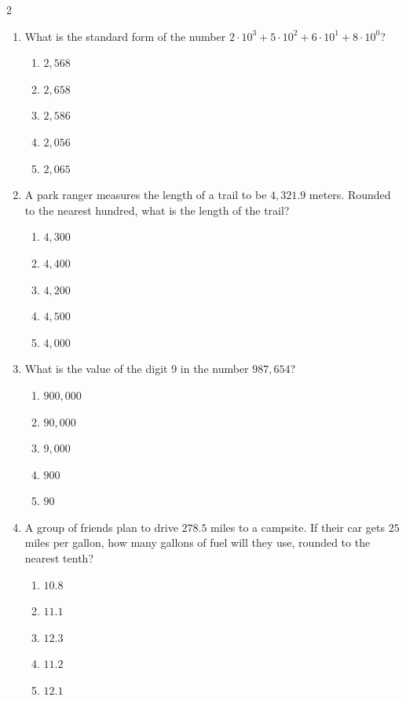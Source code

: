 \documentclass[10pt]{article}
\begin{document}
\begin{multicols}{2}
\begin{enumerate}[label=\textbf{Q\arabic*.}, leftmargin=*, itemsep=6pt, parsep=0pt]
  \item \small What is the standard form of the number $2 \cdot 10^3 + 5 \cdot 10^2 + 6 \cdot 10^1 + 8 \cdot 10^0$?
  \begin{enumerate}[label=(\Alph*), leftmargin=0.6cm, nosep, itemsep=2pt]
    \item $2,568$
    \item $2,658$
    \item $2,586$
    \item $2,056$
    \item $2,065$
  \end{enumerate}

  \item \small A park ranger measures the length of a trail to be $4,321.9$ meters. Rounded to the nearest hundred, what is the length of the trail?
  \begin{enumerate}[label=(\Alph*), leftmargin=0.6cm, nosep, itemsep=2pt]
    \item $4,300$
    \item $4,400$
    \item $4,200$
    \item $4,500$
    \item $4,000$
  \end{enumerate}

  \item \small What is the value of the digit 9 in the number $987,654$?
  \begin{enumerate}[label=(\Alph*), leftmargin=0.6cm, nosep, itemsep=2pt]
    \item $900,000$
    \item $90,000$
    \item $9,000$
    \item $900$
    \item $90$
  \end{enumerate}

  \item \small A group of friends plan to drive $278.5$ miles to a campsite. If their car gets $25$ miles per gallon, how many gallons of fuel will they use, rounded to the nearest tenth?
  \begin{enumerate}[label=(\Alph*), leftmargin=0.6cm, nosep, itemsep=2pt]
    \item $10.8$
    \item $11.1$
    \item $12.3$
    \item $11.2$
    \item $12.1$
  \end{enumerate}


\end{enumerate}
\end{multicols}
\end{document}
